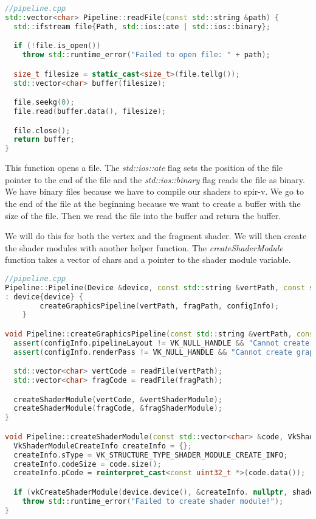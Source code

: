 \documentclass[12pt]{report} \usepackage{preamble}
\begin{document}
\begin{lstlisting}[language=C++]
//pipeline.cpp
std::vector<char> Pipeline::readFile(const std::string &path) {
  std::ifstream file{Path, std::ios::ate | std::ios::binary};

  if (!file.is_open())
    throw std::runtime_error("Failed to open file: " + path);

  size_t filesize = static_cast<size_t>(file.tellg());
  std::vector<char> buffer(filesize);

  file.seekg(0);
  file.read(buffer.data(), filesize);

  file.close();
  return buffer;
}
\end{lstlisting}

This function opens a file. The \textit{std::ios::ate} flag sets the position of the file pointer to the end of the file and the
\textit{std::ios::binary} flag reads the file as binary. We have binary files because we have to compile our shaders to spir-v.
We go to the end of the file at the beginning because we want to create a buffer with the size of the file. Then we read the
file into the buffer and return the buffer.

We will do this for both the vertex and the fragment shader. We will then create the shader modules with another helper function.
The \textit{createShaderModule} function takes a vector of chars and a pointer to the shader module variable.

\begin{lstlisting}[language=C++]
//pipeline.cpp
Pipeline::Pipeline(Device &device, const std::string &vertPath, const std::string &fragPath, const PipelineConfigInfo &configInfo)
: device{device} {
		createGraphicsPipeline(vertPath, fragPath, configInfo);
	}

void Pipeline::createGraphicsPipeline(const std::string &vertPath, const std::string &fragPath, const PipelineConfigInfo &configInfo) {
  assert(configInfo.pipelineLayout != VK_NULL_HANDLE && "Cannot create graphics pipeline. Invalid pipeline layout!");
  assert(configInfo.renderPass != VK_NULL_HANDLE && "Cannot create graphics pipeline. Invalid render pass!");

  std::vector<char> vertCode = readFile(vertPath);
  std::vector<char> fragCode = readFile(fragPath);

  createShaderModule(vertCode, &vertShaderModule);
  createShaderModule(fragCode, &fragShaderModule);
}

void Pipeline::createShaderModule(const std::vector<char> &code, VkShaderModule *shaderModule) {
  VkShaderModuleCreateInfo createInfo = {};
  createInfo.sType = VK_STRUCTURE_TYPE_SHADER_MODULE_CREATE_INFO;
  createInfo.codeSize = code.size();
  createInfo.pCode = reinterpret_cast<const uint32_t *>(code.data());

  if (vkCreateShaderModule(device.device(), &createInfo. nullptr, shaderModule) != VK_SUCCESS)
    throw std::runtime_error("Failed to create shader module!");
}
\end{lstlisting}
\end{document}
